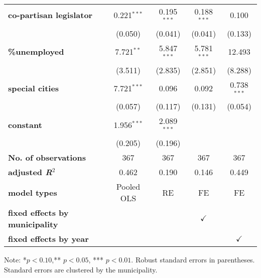 \begin{table}[!htbp]
{\begin{threeparttable}
\begin{tabular}{lcccc}
\textbf{co-partisan legislator}         & 0.221$^{***}$ & 0.195$^{***}$ & 0.188$^{***}$& 0.100           \\
                                        & (0.050)       & (0.041)       & (0.041)       & (0.133)        \\
\textbf{\%unemployed}                   & 7.721$^{**}$  & 5.847$^{***}$ & 5.781$^{***}$& 12.493          \\
                                        & (3.511)       & (2.835)       & (2.851)       & (8.288)        \\
\textbf{special cities }                & 7.721$^{***}$ & 0.096         & 0.092         & 0.738$^{***}$  \\
                                        & (0.057)       & (0.117)       & (0.131)       & (0.054)        \\
\textbf{constant}                       & 1.956$^{***}$ & 2.089$^{***}$ &               &                \\
                                        & (0.205)       & (0.196)       &               &                \\
\midrule 
\textbf{No. of observations}            & 367           & 367           & 367           & 367            \\
\textbf{adjusted \textit{R}$^{2}$}      & 0.462         & 0.190         & 0.146         & 0.449          \\
\textbf{model types}                    & Pooled OLS    & RE            & FE            & FE             \\
\textbf{fixed effects  by municipality} &               &               & $\checkmark$  &                \\
\textbf{fixed effects by year}          &               &               &               & $\checkmark$   \\
\midrule
\end{tabular}
\begin{tablenotes}
Note: *\(p<0.10\),** \(p<0.05\), *** \(p<0.01\). Robust standard errors in parentheses.  Standard errors are clustered by the municipality.
\end{tablenotes}
    \end{threeparttable}
    }
\end{table}